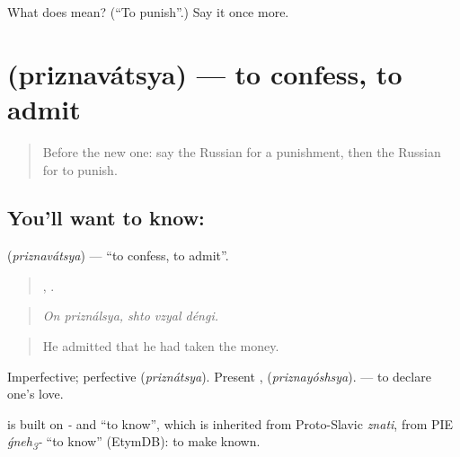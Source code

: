 \begin{tcolorbox}[breakable,colback=teal!4,colframe=teal!35!black,title={Before you move on}]
What does  mean? (\textquotedblleft{}To punish\textquotedblright{}.) Say it once more.
\end{tcolorbox}
\section[\texorpdfstring{\ru{признаваться} (priznavátsya)}{признаваться (priznavátsya)}]{ (priznavátsya) — to confess, to admit}

\label{lesson:RU-C294-priznavatsya}



\begin{quote}
Before the new one: say the Russian for a punishment, then the Russian for to punish.
\end{quote}

\subsection*{You'll want to know: }
\textbf{} (\emph{priznavátsya}) — \textquotedblleft{}to confess, to admit\textquotedblright{}.

\begin{quote}
 ,   .
\end{quote}

\begin{quote}
\emph{On priználsya, shto vzyal déngi.}
\end{quote}

\begin{quote}
He admitted that he had taken the money.
\end{quote}

Imperfective; perfective \emph{} (\emph{priznátsya}). Present \emph{}, \emph{} (\emph{priznayóshsya}). \emph{  } — to declare one's love.

\begin{cousinweb}
\emph{} is built on \emph{-} and \emph{} \textquotedblleft{}to know\textquotedblright{}, which is inherited from Proto-Slavic \emph{znati}, from PIE \emph{ǵneh\textsubscript{3}-} \textquotedblleft{}to know\textquotedblright{} (EtymDB): to make known.
\end{cousinweb}

